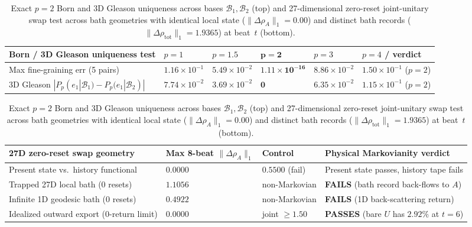 \begin{table}[tb]
\centering
\caption{Exact $p = 2$ Born and 3D Gleason uniqueness across bases $\mathcal{B}_1, \mathcal{B}_2$ (top) and
27-dimensional zero-reset joint-unitary swap test across bath geometries with identical local state ($\|\Delta\rho_A\|_1
= 0.00$) and distinct bath records ($\|\Delta\rho_{\mathrm{tot}}\|_1 = 1.9365$) at beat~$t$ (bottom).}
\label{tab:born-swap}
\footnotesize
\begin{tabularx}{\textwidth}{@{}>{\raggedright\arraybackslash}p{3.65cm}>{\centering\arraybackslash}p{1.55cm}>{\centering\arraybackslash}p{1.55cm}>{\centering\arraybackslash}p{2.00cm}>{\centering\arraybackslash}p{1.55cm}>{\raggedright\arraybackslash}X@{}}
\toprule
Born / 3D Gleason uniqueness test & $p = 1$ & $p = 1.5$ & $\mathbf{p = 2}$ & $p = 3$ & $p = 4$ / verdict \\
\midrule
Max fine-graining err (5 pairs) & $1.16 \times 10^{-1}$ & $5.49 \times 10^{-2}$ & $\mathbf{1.11 \times 10^{-16}}$ & $8.86 \times 10^{-2}$ & $1.50 \times 10^{-1}$ ($p = 2$) \\
3D Gleason $|P_p(e_1|\mathcal{B}_1) - P_p(e_1|\mathcal{B}_2)|$ & $7.74 \times 10^{-2}$ & $3.69 \times 10^{-2}$ & $\mathbf{0}$ & $6.35 \times 10^{-2}$ & $1.15 \times 10^{-1}$ ($p = 2$) \\
\bottomrule
\end{tabularx}

\vspace{5pt}
\begin{tabularx}{\textwidth}{@{}>{\raggedright\arraybackslash}p{4.85cm}>{\centering\arraybackslash}p{2.35cm}>{\centering\arraybackslash}p{2.20cm}>{\raggedright\arraybackslash}X@{}}
\toprule
27D zero-reset swap geometry & Max 8-beat $\|\Delta\rho_A\|_1$ & Control & Physical Markovianity verdict \\
\midrule
Present state vs.\ history functional & $0.0000$ & $0.5500$ (fail) & Present state passes, history tape fails \\
Trapped 27D local bath (0 resets) & $\mathbf{1.1056}$ & non-Markovian & \textbf{FAILS} (bath record back-flows to $A$) \\
Infinite 1D geodesic bath (0 resets) & $\mathbf{0.4922}$ & non-Markovian & \textbf{FAILS} (1D back-scattering return) \\
Idealized outward export (0-return limit) & $\mathbf{0.0000}$ & joint $\ge 1.50$ & \textbf{PASSES} (bare $U$ has $2.92\%$ at $t = 6$) \\
\bottomrule
\end{tabularx}
\end{table}


